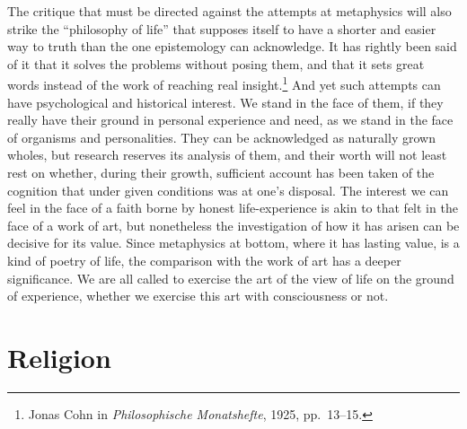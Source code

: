 \documentclass[12pt]{book}
\newcommand{\opage}[1]{\marginnote{\footnotesize\textit{[#1]}}}
\begin{document}
The critique that must be directed against the attempts at metaphysics \opage{99}will also strike the ``philosophy of life'' that
supposes itself to have a shorter and easier way to truth than the one epistemology can acknowledge. It has rightly been
said of it that it solves the problems without posing them, and that it sets great words instead of the work of reaching
real insight.\footnote{Jonas Cohn in \textit{Philosophische Monatshefte}, 1925, pp.\ 13--15.} And yet such attempts can
have psychological and historical interest. We stand in the face of them, if they really have their ground in personal
experience and need, as we stand in the face of organisms and personalities. They can be acknowledged as naturally
grown wholes, but research reserves its analysis of them, and their worth will not least rest on whether, during their
growth, sufficient account has been taken of the cognition that under given conditions was at one's disposal. The
interest we can feel in the face of a faith borne by honest life-experience is akin to that felt in the face of a work of
art, but nonetheless the investigation of how it has arisen can be decisive for its value. Since metaphysics at bottom,
where it has lasting value, is a kind of poetry of life, the comparison with the work of art has a deeper significance.
We are all called to exercise the art of the view of life on the ground of experience, whether we exercise this art with
consciousness or not.

\chapter{Religion}
\label{ch:6}
\end{document}
